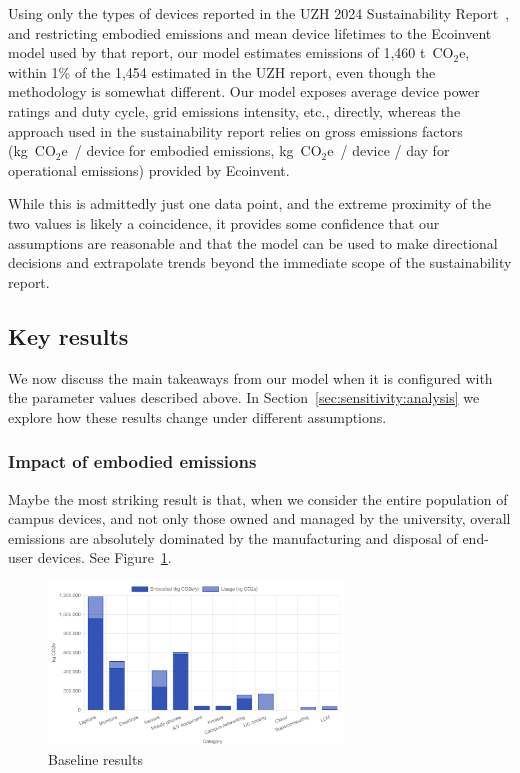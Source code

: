 \documentclass[11pt]{article}
\newcommand{\coe}{CO$_2$e}
\newcommand{\gcoe}{g~\coe}
\newcommand{\tcoe}{t~\coe}
\newcommand{\kgcoe}{k\gcoe}
\let\cite\parencite
\begin{document}
Using only the types of devices reported in the UZH 2024 Sustainability Report~\cite{uzh:sustainability:report}, and restricting embodied emissions and mean device lifetimes to the Ecoinvent~\cite{ecoinvent} model used by that report, our model estimates emissions of 1,460 \tcoe, within 1\% of the 1,454 estimated in the UZH report, even though the methodology is somewhat different. Our model exposes average device power ratings and duty cycle, grid emissions intensity, etc., directly, whereas the approach used in the sustainability report relies on gross emissions factors (\kgcoe\ / device for embodied emissions, \kgcoe\ / device / day for operational emissions) provided by Ecoinvent.

While this is admittedly just one data point, and the extreme proximity of the two values is likely a coincidence, it provides some confidence that our assumptions are reasonable and that the model can be used to make directional decisions and extrapolate trends beyond the immediate scope of the sustainability report.

\subsection{Key results}

We now discuss the main takeaways from our model when it is configured with the parameter values described above. In Section~\ref{sec:sensitivity:analysis} we explore how these results change under different assumptions.

\subsubsection*{Impact of embodied emissions}

Maybe the most striking result is that, when we consider the entire population of campus devices, and not only those owned and managed by the university, overall emissions are absolutely dominated by the manufacturing and disposal of end-user devices. See Figure~\ref{fig:baseline}.

\begin{figure}[h]
  \centering
  \includegraphics[width=0.7\textwidth]{fig-baseline.png}
  \caption{Baseline results}
  \label{fig:baseline}
\end{figure}
\end{document}
